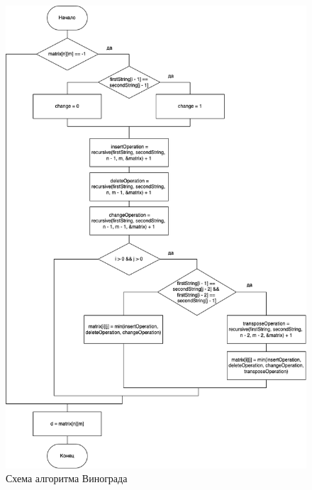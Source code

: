 \begin{figure}[ht!]
	\centering
	\includegraphics[scale=0.6]{img/dl_cash.png}
	\caption{Схема алгоритма Винограда}
	\label{fig:mpr}
\end{figure}

\pagebreak


